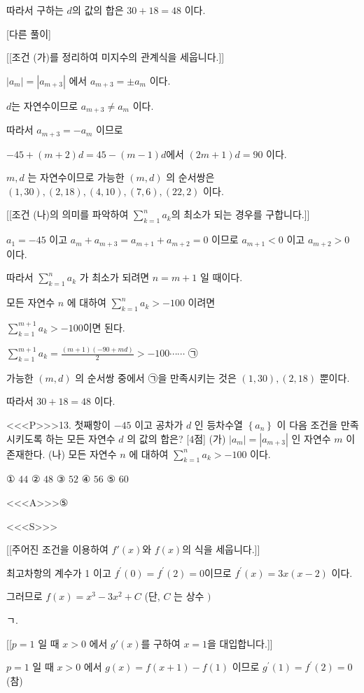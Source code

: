\documentclass{oblivoir}
\begin{document}
따라서 구하는 $d$의 값의 합은 $30+18=48$ 이다.

[다른 풀이]

[[조건 (가)를 정리하여 미지수의 관계식을 세웁니다.]]

$\left|a_{m}\right|=\left|a_{m+3}\right|$ 에서 $a_{m+3}=\pm a_{m}$ 이다.

$d$는 자연수이므로 $a_{m+3} \neq a_{m}$ 이다.

따라서 $a_{m+3}=-a_{m}$ 이므로

$-45+(m+2) d=45-(m-1) d$에서 $(2 m+1) d=90 $ 이다.

$m, d$ 는 자연수이므로 가능한 $(m, d)$ 의 순서쌍은 $(1,30),(2,18),(4,10),(7,6),(22,2)$ 이다.

[[조건 (나)의 의미를 파악하여 $\sum_{k=1}^{n} a_{k}$의 최소가 되는 경우를 구합니다.]]

$a_{1}=-45$ 이고 $a_{m}+a_{m+3}=a_{m+1}+a_{m+2}=0$ 이므로 $a_{m+1}<0$ 이고 $a_{m+2}>0$ 이다.

따라서 $\sum_{k=1}^{n} a_{k}$ 가 최소가 되려면 $n=m+1$ 일 때이다.

모든 자연수 $n$ 에 대하여 $\sum_{k=1}^{n} a_{k}>-100$ 이려면

$\sum_{k=1}^{m+1} a_{k}>-100 $이면 된다.

$\sum_{k=1}^{m+1} a_{k}=\frac{(m+1)(-90+m d)}{2}>-100 \cdots \cdots $ ㉠

가능한 $(m, d)$ 의 순서쌍 중에서  ㉠을 만족시키는 것은 $(1,30),(2,18)$ 뿐이다.

따라서 $30+18=48$ 이다.

<<<P>>>13. 첫째항이 $-45$ 이고 공차가 $d$ 인 등차수열 $\left\{a_{n}\right\}$ 이 다음 조건을 만족시키도록 하는 모든 자연수 $d$ 의 값의 합은? [4점]
(가) $\left|a_{m}\right|=\left|a_{m+3}\right|$ 인 자연수 $m$ 이 존재한다.
(나) 모든 자연수 $n$ 에 대하여 $\sum_{k=1}^{n} a_{k}>-100$ 이다.

① $44$
② $48$
③ $52$
④ $56$
⑤ $60$

<<<A>>>⑤

<<<S>>>

[[주어진 조건을 이용하여 $f'(x)$와 $f(x)$의 식을 세웁니다.]]

최고차항의 계수가 1 이고 $f^{\prime}(0)=f^{\prime}(2)=0$이므로 $f^{\prime}(x)=3 x(x-2)$ 이다.

그러므로 $f(x)=x^{3}-3 x^{2}+C$ (단, $C$ 는 상수 $)$

ㄱ.

[[$p=1$ 일 때 $x>0$ 에서 $g'(x)$를 구하여 $x=1$을 대입합니다.]]

$p=1$ 일 때 $x>0$ 에서 $g(x)=f(x+1)-f(1)$ 이므로 $g^{\prime}(1)=f^{\prime}(2)=0$ (참)
\end{document}

